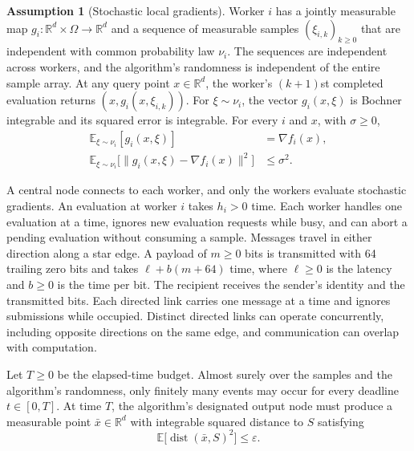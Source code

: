 \documentclass[10pt]{article}
\theoremstyle{definition}
\newtheorem{assumption}{Assumption}
\begin{document}
\begin{assumption}[Stochastic local gradients]
Worker $i$ has a jointly measurable map $g_i:\mathbb{R}^d\times\Omega\to\mathbb{R}^d$ and a sequence of measurable samples $(\xi_{i,k})_{k\geq 0}$ that are independent with common probability law $\nu_i$. The sequences are independent across workers, and the algorithm's randomness is independent of the entire sample array. At any query point $x\in\mathbb{R}^d$, the worker's $(k+1)$st completed evaluation returns $(x,g_i(x,\xi_{i,k}))$. For $\xi\sim\nu_i$, the vector $g_i(x,\xi)$ is Bochner integrable and its squared error is integrable. For every $i$ and $x$, with $\sigma\geq 0$,
\[
\begin{aligned}
\mathbb{E}_{\xi\sim\nu_i}[g_i(x,\xi)] &= \nabla f_i(x),\\
\mathbb{E}_{\xi\sim\nu_i}\bigl[\|g_i(x,\xi)-\nabla f_i(x)\|^2\bigr] &\leq \sigma^2.
\end{aligned}
\]
\end{assumption}

A central node connects to each worker, and only the workers evaluate stochastic gradients. An evaluation at worker $i$ takes $h_i>0$ time. Each worker handles one evaluation at a time, ignores new evaluation requests while busy, and can abort a pending evaluation without consuming a sample. Messages travel in either direction along a star edge. A payload of $m\geq 0$ bits is transmitted with 64 trailing zero bits and takes $\ell+b(m+64)$ time, where $\ell\geq 0$ is the latency and $b\geq 0$ is the time per bit. The recipient receives the sender's identity and the transmitted bits. Each directed link carries one message at a time and ignores submissions while occupied. Distinct directed links can operate concurrently, including opposite directions on the same edge, and communication can overlap with computation.

Let $T\geq 0$ be the elapsed-time budget. Almost surely over the samples and the algorithm's randomness, only finitely many events may occur for every deadline $t\in[0,T]$. At time $T$, the algorithm's designated output node must produce a measurable point $\bar{x}\in\mathbb{R}^d$ with integrable squared distance to $S$ satisfying
\[
\mathbb{E}\bigl[\operatorname{dist}(\bar{x},S)^2\bigr]\leq\varepsilon.
\]
\end{document}
